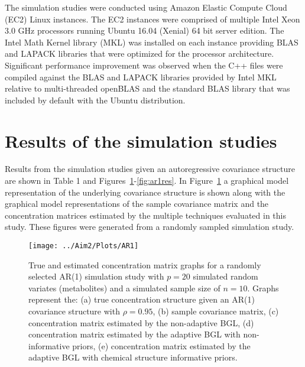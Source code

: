 \begin{DoubleSpace*}
The simulation studies were conducted using Amazon Elastic Compute Cloud (EC2) Linux instances. The EC2 instances were comprised of multiple Intel Xeon 3.0 GHz processors running Ubuntu 16.04 (Xenial) 64 bit server edition. The Intel Math Kernel library (MKL) was installed on each instance providing BLAS and LAPACK libraries that were optimized for the processor architecture. Significant performance improvement was observed when the C++ files were compiled against the BLAS and LAPACK libraries provided by Intel MKL relative to multi-threaded openBLAS and the standard BLAS library that was included by default with the Ubuntu distribution. 

\section{Results of the simulation studies}
Results from the simulation studies given an autoregressive covariance structure are shown in Table 1 and Figures~\ref{fig:ar1}-\ref{fig:ar1res}. In Figure~\ref{fig:ar1} a graphical model representation of the underlying covariance structure is shown along with the graphical model representations of the sample covariance matrix and the concentration matrices estimated by the multiple techniques evaluated in this study. These figures were generated from a randomly sampled simulation study. 
\end{DoubleSpace*}

\newpage
{}
\recalctypearea
\begin{figure}[h!]
\texttt{[image: ../Aim2/Plots/AR1]}
	\caption[AR(1) Simulation]{True and estimated concentration matrix graphs for a randomly selected AR(1) simulation study with $p=20$ simulated random variates (metabolites) and a simulated sample size of $n=10$. Graphs represent the: (a) true concentration structure given an AR(1) covariance structure with $\rho=0.95$, (b) sample covariance matrix, (c) concentration matrix estimated by the non-adaptive BGL, (d) concentration matrix estimated by the adaptive BGL with non-informative priors, (e) concentration matrix estimated by the adaptive BGL with chemical structure informative priors.  \label{fig:ar1} }
\end{figure}
\newpage
{}
\recalctypearea

